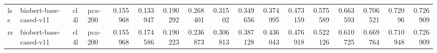 \begin{tabular}{llllrrrrrrrrrrrrr}
 lss         & biobert-base-cased-v11 & cl4l             & pca-200               &     0.155968 &     0.133947 &     0.190292 &     0.268401 &     0.31502  &     0.349656 &     0.374995 &     0.473159 &     0.575589 &     0.663593 &      0.706521 &      0.72096  &      0.726909 \\
 rs          & biobert-base-cased-v11 & cl4l             & pca-200               &     0.155968 &     0.174586 &     0.190223 &     0.236873 &     0.306813 &     0.387128 &     0.436043 &     0.476918 &     0.522126 &     0.610725 &      0.669764 &      0.710948 &      0.726909 \\
\hline
\end{tabular}